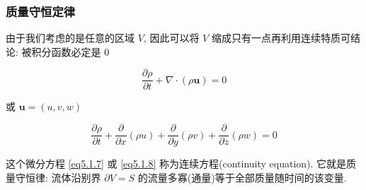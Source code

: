 \documentclass[aspectratio=2516]{beamer}
\begin{document}
\begin{frame}
\frametitle{\kaishu 质量守恒定律}

\kaishu 

由于我们考虑的是任意的区域 $ V $, 因此可以将 $ V $ 缩成只有一点再利用连续特质可结论: 被积分函数必定是 0

\vspace{0.5cm}

\begin{equation}
\frac{{\partial \rho }}{{\partial t}} + \nabla  \cdot \left( {\rho \boldsymbol{u}} \right) = 0
\label{eq5.1.7}
\end{equation}

\vspace{0.5cm}

或 $\boldsymbol{u} = \left( {u,v,w} \right)$

\begin{equation}
\frac{{\partial \rho }}{{\partial t}} + \frac{\partial }{{\partial x}}\left( {\rho u} \right) + \frac{\partial }{{\partial y}}\left( {\rho v} \right) + \frac{\partial }{{\partial z}}\left( {\rho w} \right) = 0
\label{eq5.1.8}
\end{equation}

\vspace{0.5cm}

这个微分方程 \ref{eq5.1.7} 或 \ref{eq5.1.8} 称为连续方程(continuity equation). 它就是质量守恒律: 流体沿别界 $\partial V = S$ 的流量多寡(通量)等于全部质量随时间的该变量. 

\end{frame}

\end{document}
